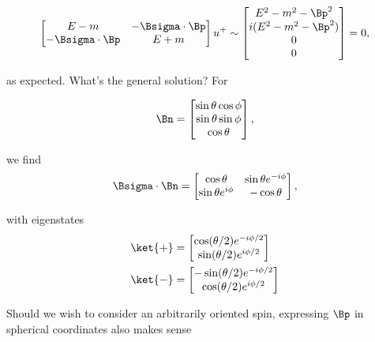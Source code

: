 \begin{equation}\label{eqn:desaiDiracAdjoint:260}
\begin{bmatrix}
E - m & - \Bsigma \cdot \Bp \\
- \Bsigma \cdot \Bp & E + m
\end{bmatrix}
u^{+}
\sim 
\begin{bmatrix}
E^2 - m^2 - \Bp^2 \\
i (E^2 - m^2 - \Bp^2 ) \\
0 \\
0
\end{bmatrix}
= 0,
\end{equation}

as expected.  What's the general solution?  For 

\begin{equation}\label{eqn:desaiDiracAdjoint:280}
\Bn = 
\begin{bmatrix}
\sin\theta \cos\phi \\
\sin\theta \sin\phi \\
\cos\theta 
\end{bmatrix},
\end{equation}

we find 
\begin{equation}\label{eqn:desaiDiracAdjoint:300}
\Bsigma \cdot \Bn =
\begin{bmatrix}
\cos\theta & \sin\theta e^{-i\phi} \\
\sin\theta e^{i\phi} & -\cos\theta
\end{bmatrix},
\end{equation}

with eigenstates
\begin{subequations}
\begin{align}\label{eqn:desaiDiracAdjoint:320}
\ket{+} 
&=
\begin{bmatrix}
\cos(\theta/2) e^{-i\phi/2} \\
\sin(\theta/2) e^{i\phi/2} \\
\end{bmatrix} \\
\ket{-} 
&=
\begin{bmatrix}
-\sin(\theta/2) e^{-i\phi/2} \\
\cos(\theta/2) e^{i\phi/2} \\
\end{bmatrix} 
\end{align}
\end{subequations}

Should we wish to consider an arbitrarily oriented spin, expressing $\Bp$ in spherical coordinates also makes sense

